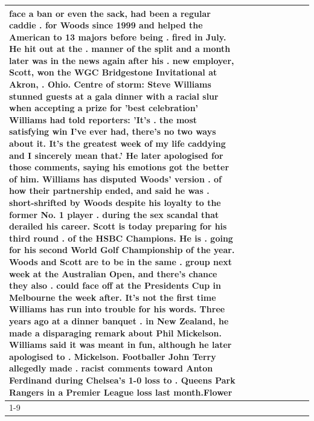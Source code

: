 \begin{table}[H]
\begin{tabular}{lllrlllll}
face a ban or even the sack, had been a regular caddie . for Woods since 1999 and helped the American to 13 majors before being . fired in July. He hit out at the . manner of the split and a month later was in the news again after his . new employer, Scott, won the WGC Bridgestone Invitational at Akron, . Ohio. Centre of storm: Steve Williams stunned guests at a gala dinner with a racial slur when accepting a prize for 'best celebration' Williams had told reporters: 'It's . the most satisfying win I've ever had, there's no two ways about it. It's the greatest week of my life caddying and I sincerely mean that.' He later apologised for those comments, saying his emotions got the better of him. Williams has disputed Woods' version . of how their partnership ended, and said he was . short-shrifted by Woods despite his loyalty to the former No. 1 player . during the sex scandal that derailed his career. Scott is today preparing for his third round . of the HSBC Champions. He is . going for his second World Golf Championship of the year. Woods and Scott are to be in the same . group next week at the Australian Open, and there's chance they also . could face off at the Presidents Cup in Melbourne the week after. It's not the first time Williams has run into trouble for his words. Three years ago at a dinner banquet . in New Zealand, he made a disparaging remark about Phil Mickelson. Williams said it was meant in fun, although he later apologised to . Mickelson. Footballer John Terry allegedly made . racist comments toward Anton Ferdinand during Chelsea's 1-0 loss to . Queens Park Rangers in a Premier League loss last month.Flower \\
\cline{1-9}

\end{tabular}
\end{table}
